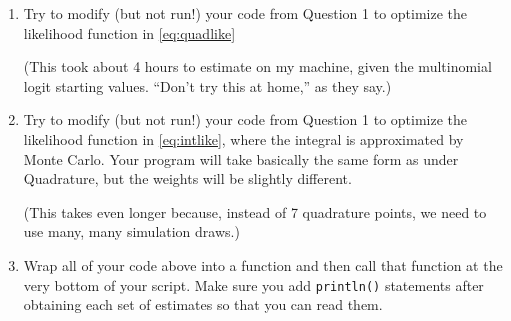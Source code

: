\documentclass[12pt,english]{article}
\begin{document}
\begin{enumerate}
\item Try to modify (but not run!) your code from Question 1 to optimize the likelihood function in \eqref{eq:quadlike}

(This took about 4 hours to estimate on my machine, given the multinomial logit starting values. ``Don't try this at home,'' as they say.)

\item Try to modify (but not run!) your code from Question 1 to optimize the likelihood function in \eqref{eq:intlike}, where the integral is approximated by Monte Carlo. Your program will take basically the same form as under Quadrature, but the weights will be slightly different.

(This takes even longer because, instead of 7 quadrature points, we need to use many, many simulation draws.)

\item Wrap all of your code above into a function and then call that function at the very bottom of your script. Make sure you add \texttt{println()} statements after obtaining each set of estimates so that you can read them.
\end{enumerate}
\end{document}
